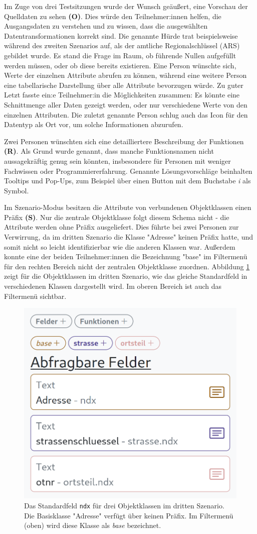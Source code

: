 Im Zuge von drei Testsitzungen wurde der Wunsch geäußert, eine Vorschau der Quelldaten zu sehen \textbf{(O)}. Dies würde den Teilnehmer:innen helfen, die Ausgangsdaten zu verstehen und zu wissen, dass die ausgewählten Datentransformationen korrekt sind. Die genannte Hürde trat beispielsweise während des zweiten Szenarios auf, als der amtliche Regionalschlüssel (\acs{ARS}) gebildet wurde. Es stand die Frage im Raum, ob führende Nullen aufgefüllt werden müssen, oder ob diese bereits existieren. Eine Person wünschte sich, Werte der einzelnen Attribute abrufen zu können, während eine weitere Person eine tabellarische Darstellung über alle Attribute bevorzugen würde. Zu guter Letzt fasste ein:e Teilnehmer:in die Möglichkeiten zusammen: Es könnte eine Schnittmenge aller Daten gezeigt werden, oder nur verschiedene Werte von den einzelnen Attributen. Die zuletzt genannte Person schlug auch das Icon für den Datentyp als Ort vor, um solche Informationen abzurufen.

Zwei Personen wünschten sich eine detailliertere Beschreibung der Funktionen \textbf{(R)}. Als Grund wurde genannt, dass manche Funktionsnamen nicht aussagekräftig genug sein könnten, insbesondere für Personen mit weniger Fachwissen oder Programmiererfahrung. Genannte Lösungsvorschläge beinhalten Tooltips und Pop-Ups, zum Beispiel über einen Button mit dem Buchstabe \textit{i} als Symbol.

Im Szenario-Modus besitzen die Attribute von verbundenen Objektklassen einen Präfix \textbf{(S)}. Nur die zentrale Objektklasse folgt diesem Schema nicht - die Attribute werden ohne Präfix ausgeliefert. Dies führte bei zwei Personen zur Verwirrung, da im dritten Szenario die Klasse "Adresse" keinen Präfix hatte, und somit nicht so leicht identifizierbar wie die anderen Klassen war. Außerdem konnte eine der beiden Teilnehmer:innen die Bezeichnung "base" im Filtermenü für den rechten Bereich nicht der zentralen Objektklasse zuordnen. Abbildung \ref{fig:scenario-prefixes} zeigt für die Objektklassen im dritten Szenario, wie das gleiche Standardfeld in verschiedenen Klassen dargestellt wird. Im oberen Bereich ist auch das Filtermenü sichtbar.

\begin{figure}[!ht]
  \centering
  \includegraphics[width=.425\textwidth]{assets/scenario-prefixes.png}
  \caption[Darstellung des Standardfeldes \texttt{ndx} für drei Objektklassen im dritten Szenario]{Das Standardfeld \texttt{ndx} für drei Objektklassen im dritten Szenario. Die Basisklasse "Adresse" verfügt über keinen Präfix. Im Filtermenü (oben) wird diese Klasse als \textit{base} bezeichnet.}
  \label{fig:scenario-prefixes}
\end{figure}

